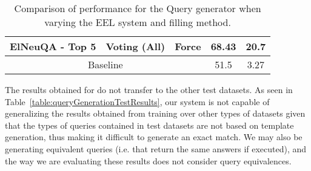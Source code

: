 \begin{table}[h!]
\begin{tabular}{|c|cc|cc|}
    ElNeuQA - Top 5                  & Voting (All)                                                                                                    & Force                                                                               & 68.43                                    & 20.7                   \\ \hline
    \multicolumn{3}{|c|}{Baseline}                                                                                                                                                                                                           & 51.5                                     & 3.27                   \\ \hline
    \end{tabular}%
    \caption{Comparison of performance for the \SPARQL{} Query generator when varying the EEL system and filling method.}
    \label{table:queryGenerationResults}
\end{table}

The results obtained for \LCQuADtwo{} do not transfer to the other test datasets. As seen in 
Table~\ref{table:queryGenerationTestResults}, our system is not capable of generalizing the results 
obtained from training over other types of datasets given that the types of queries contained in 
test datasets are not based on template generation, thus making it difficult to generate an exact 
match. We may also be generating equivalent \SPARQL{} queries (i.e. that return the same answers if 
executed), and the way we are evaluating these results does not consider \SPARQL{} query equivalences.

